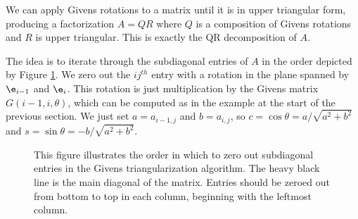 We can apply Givens rotations to a matrix until it is in upper triangular form, producing a factorization $A = QR$ where $Q$ is a composition of Givens rotations and $R$ is upper triangular.
This is exactly the QR decomposition of $A$.

The idea is to iterate through the subdiagonal entries of $A$ in the order depicted by Figure \ref{fig:givens}.
We zero out the $ij^{th}$ entry with a rotation in the plane spanned by $\e_{i-1}$ and $\e_i$.
This rotation is just multiplication by the Givens matrix $G(i-1,i,\theta)$, which can be computed as in the example at the start of the previous section.
We just set $a=a_{i-1,j}$ and $b=a_{i,j}$, so $c = \cos \theta = a/\sqrt{a^2+b^2}$ and $s = \sin \theta = -b/\sqrt{a^2+b^2}$.

\begin{figure}
\begin{center}
\caption{This figure illustrates the order in which to zero out subdiagonal entries in the Givens triangularization algorithm.
The heavy black line is the main diagonal of the matrix.
Entries should be zeroed out from bottom to top in each column, beginning with the leftmost column.}
\label{fig:givens}
\end{center}
\end{figure}

